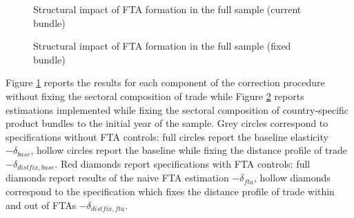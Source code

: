 \documentclass[12pt,twoside,a4paper,notitlepage]{article}
\begin{document}
\begin{figure}[h!]
\caption{Structural impact of FTA formation in the full sample (current bundle) \label{fig:ftacorrfull}}
\begin{center}
\setlength{\fboxrule}{1pt} %
\setlength{\fboxsep}{.1in} %
\end{center}
\end{figure}   

\begin{figure}[h!]
\caption{Structural impact of FTA formation in the full sample (fixed bundle) \label{fig:ftacorrfullc63}}
\begin{center}
\setlength{\fboxrule}{1pt} %
\setlength{\fboxsep}{.1in} %
\end{center}
\end{figure}  

Figure \ref{fig:ftacorrfull} reports the results for each component of the correction procedure without fixing the sectoral composition of trade while Figure \ref{fig:ftacorrfullc63} reports estimations implemented while fixing the sectoral composition of country-specific product bundles to the initial year of the sample.
Grey circles correspond to specifications without FTA controls: full circles report the baseline elasticity $-\delta_{base}$, hollow circles report the baseline while fixing the distance profile of trade  $-\delta_{distfix,base}$.
Red diamonds report specifications with FTA controls: full diamonds report results of the naive FTA estimation $-\delta_{fta}$,  hollow diamonds correspond to the specification which fixes the distance profile of trade within and out of FTAs $-\delta_{distfix,fta}$.
\end{document}
